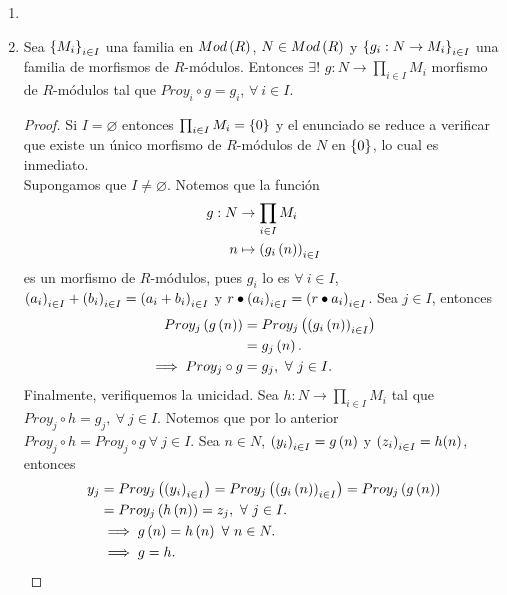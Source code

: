 \documentclass{article}
\begin{document}
\begin{enumerate}[label=\textbf{Ej \arabic*.}]
\begin{proof}
			De manera análoga, para cada $i \in I$, la proyección $proy_{i}$ es un epimorfismo, sustituyendo $Inc_{i}$ por $inc_{i}$.
		\end{proof}
		\item 
		\item Sea ${\left\{{M}_{i}\right\}}_{i\in I}$ una familia en $Mod\left(R\right)$, $N\in Mod\left(R\right)$ y $\left\{g_i:N\to M_i\right\}_{i\in I}$ una familia de morfismos de $R$-módulos. Entonces $\exists !$ $g:N\to\prod_{i\in I}M_i$ morfismo de $R$-módulos  tal que $Proy_i\circ g=g_i$, $\forall\ i\in I$.
		\begin{proof}
			Si $I=\varnothing$ entonces $\prod_{i\in I}M_i=\left\{0\right\}$ y el enunciado se reduce a verificar que existe un único morfismo de $R$-módulos de $N$ en $\left\{0\right\}$, lo cual es inmediato.\\
		Supongamos que $I\neq\varnothing$. Notemos que la función
		\begin{align*}
			g: N &\rightarrow \prod_{i\in I}M_i\\ n &\mapsto \left(g_i\left(n\right)\right)_{i\in I}
		\end{align*}
es un morfismo de $R$-módulos, pues $g_i$ lo es $\forall\ i\in I$, ${\left({a}_{i}\right)}_{i\in I}+{\left({b}_{i}\right)}_{i\in I}=\left(a_i+b_i\right)_{i\in I}$ y $r\bullet{\left({a}_{i}\right)}_{i\in I}=\left(r\bullet a_i\right)_{i\in I}$. Sea $j\in I$, entonces
		\begin{align*}
			Proy_j\left(g\left(n\right)\right)&=Proy_j\left(\left(g_i\left(n\right)\right)_{i\in I}\right)\\
			&=g_j\left(n\right).\\
			\implies Proy_j\circ g&=g_j,\ \forall\ j\in I.
\end{align*}
Finalmente, verifiquemos la unicidad. Sea $h:N\to\prod_{i\in I}M_i$ tal que $Proy_j\circ h=g_j,\ \forall\ j\in I$. Notemos que por lo anterior $Proy_j\circ h=Proy_j\circ g\ \forall\ j\in I$. Sea $n\in N$, ${\left({y}_{i}\right)}_{i\in I}=g\left(n\right)$ y ${\left({z}_{i}\right)}_{i\in I}=h(n)$, entonces
\begin{align*}
	y_j&=Proy_j\left({\left({y}_{i}\right)}_{i\in I}\right)=Proy_j\left(\left(g_i\left(n\right)\right)_{i\in I}\right)=Proy_j\left(g\left(n\right)\right)\\
	&=Proy_j\left(h\left(n\right)\right)= z_j,\ \forall\ j\in I.\\
	&\implies g\left(n\right)=h\left(n\right)\ \forall\ n\in N.\\
	&\implies g=h.
\end{align*}
		\end{proof}
	

\end{enumerate}
\end{document}
